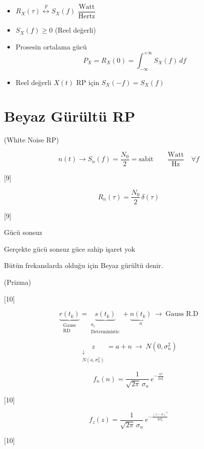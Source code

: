 \documentclass[11pt,a4paper]{article}
\begin{document}
\begin{itemize}
\item $R_X(\tau)\overset{F}{\longleftrightarrow}S_X(f)$ \quad $\dfrac{\text{Watt}}{\text{Hertz}}$
\item $S_X(f)\ge 0$ \quad (Reel değerli)
\end{itemize}

\begin{itemize}
\item Prosesin ortalama gücü
\[ P_X=R_X(0)=\int_{-\infty}^{+\infty} S_X(f)\,df \]
\item Reel değerli $X(t)$ RP için $S_X(-f)=S_X(f)$
\end{itemize}

\section{Beyaz Gürültü RP}
(White Noise RP)

\[ n(t)\rightarrow S_n(f)=\frac{N_0}{2}=\text{sabit}\qquad \frac{\text{Watt}}{\text{Hz}}\quad \forall f \]

[9]

\[ R_n(\tau)=\frac{N_0}{2}\,\delta(\tau) \]

[9]

Gücü sonsuz

Gerçekte gücü sonsuz güce sahip işaret yok

Bütün frekanslarda olduğu için Beyaz gürültü denir.

(Prizma)

[10]

\[ \underbrace{r(t_k)}_{\substack{\text{Gauss}\\ \text{RD}}} = \underbrace{s(t_k)}_{\substack{a_i\\ \text{Deterministic}}} + \underbrace{n(t_k)}_{n} \ \rightarrow\ \text{Gauss R.D} \]

\[ \underset{\substack{\downarrow\\ N(a,\sigma_n^2)}}{z}=a+n\ \rightarrow\ N(0,\sigma_n^2) \]

\[ f_n(n)=\frac{1}{\sqrt{2\pi}\,\sigma_n}\,e^{-\frac{n^2}{2\sigma_n^2}} \]

[10]

\[ f_z(z)=\frac{1}{\sqrt{2\pi}\,\sigma_n}\,e^{-\frac{(z-a)^2}{2\sigma_n^2}} \]

[10]
\end{document}
